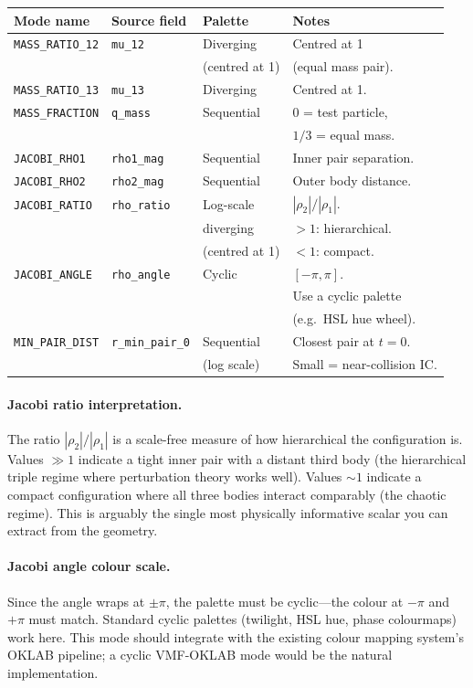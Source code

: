 \documentclass[11pt]{article}
\newcommand{\field}[1]{\texttt{#1}}
\begin{document}
\begin{center}
\begin{tabular}{llll}
\toprule
Mode name & Source field & Palette & Notes \\
\midrule
\texttt{MASS\_RATIO\_12} & \field{mu\_12} & Diverging & Centred at 1 \\
 & & (centred at 1) & (equal mass pair). \\
\texttt{MASS\_RATIO\_13} & \field{mu\_13} & Diverging & Centred at 1. \\
\texttt{MASS\_FRACTION} & \field{q\_mass} & Sequential & 0 = test particle, \\
 & & & $1/3$ = equal mass. \\
\texttt{JACOBI\_RHO1} & \field{rho1\_mag} & Sequential & Inner pair separation. \\
\texttt{JACOBI\_RHO2} & \field{rho2\_mag} & Sequential & Outer body distance. \\
\texttt{JACOBI\_RATIO} & \field{rho\_ratio} & Log-scale & $|\rho_2|/|\rho_1|$. \\
 & & diverging & $> 1$: hierarchical. \\
 & & (centred at 1) & $< 1$: compact. \\
\texttt{JACOBI\_ANGLE} & \field{rho\_angle} & Cyclic & $[-\pi, \pi]$. \\
 & & & Use a cyclic palette \\
 & & & (e.g.\ HSL hue wheel). \\
\texttt{MIN\_PAIR\_DIST} & \field{r\_min\_pair\_0} & Sequential & Closest pair at $t=0$. \\
 & & (log scale) & Small = near-collision IC. \\
\bottomrule
\end{tabular}
\end{center}

\paragraph{Jacobi ratio interpretation.} The ratio $|\rho_2|/|\rho_1|$ is a
scale-free measure of how hierarchical the configuration is. Values $\gg 1$
indicate a tight inner pair with a distant third body (the hierarchical triple
regime where perturbation theory works well). Values $\sim 1$ indicate a compact
configuration where all three bodies interact comparably (the chaotic regime).
This is arguably the single most physically informative scalar you can extract
from the geometry.

\paragraph{Jacobi angle colour scale.} Since the angle wraps at $\pm\pi$, the
palette must be cyclic---the colour at $-\pi$ and $+\pi$ must match. Standard
cyclic palettes (twilight, HSL hue, phase colourmaps) work here. This mode
should integrate with the existing colour mapping system's OKLAB pipeline; a
cyclic VMF-OKLAB mode would be the natural implementation.
\end{document}
